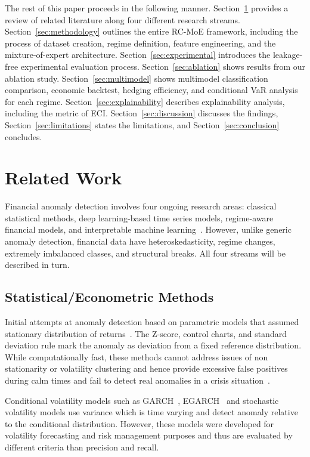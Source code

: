 \documentclass[]{interact}
\begin{document}
The rest of this paper proceeds in the following manner.
Section~\ref{sec:related} provides a review of related literature along four different research streams. Section~\ref{sec:methodology} outlines the entire RC-MoE
framework, including the process of dataset creation, regime definition, feature engineering, and the mixture-of-expert architecture. Section~\ref{sec:experimental} introduces the leakage-free experimental evaluation process. Section~\ref{sec:ablation} shows results from our ablation study.
Section~\ref{sec:multimodel} shows multimodel classification comparison, economic backtest, hedging efficiency, and conditional VaR analysis for each regime. Section~\ref{sec:explainability} describes explainability analysis, including the metric of ECI.
Section~\ref{sec:discussion} discusses the findings, Section~\ref{sec:limitations} states the limitations, and Section~\ref{sec:conclusion} concludes.

\section{Related Work}\label{sec:related}
Financial anomaly detection involves four ongoing research
areas: classical statistical methods, deep learning-based time series
models, regime-aware financial models, and interpretable machine
learning~\citep{liu2024times, chandola2009anomaly}. However, unlike generic anomaly detection, financial data have heteroskedasticity, regime changes, extremely imbalanced classes, and structural breaks. All four streams will be
described in turn.

\subsection{Statistical/Econometric Methods}

Initial attempts at anomaly detection based on parametric
models that assumed stationary distribution of returns~\citep{mandelbrot1963variation, cont2001empirical, fama1970efficient}.
The Z-score, control charts, and standard deviation rule mark the
anomaly as deviation from a fixed reference distribution. While
computationally fast, these methods cannot address issues of non
stationarity or volatility clustering and hence provide excessive false
positives during calm times and fail to detect real anomalies in a
crisis situation~\citep{engle1982arch, bollerslev1986a}.

Conditional volatility models such as GARCH~\citep{bollerslev1986a}, EGARCH~\citep{nelson1991egarch}
and stochastic volatility models use variance which is time varying
and detect anomaly relative to the conditional distribution. However, these models were developed for volatility forecasting and risk
management purposes and thus are evaluated by different criteria than precision and recall.
\end{document}
